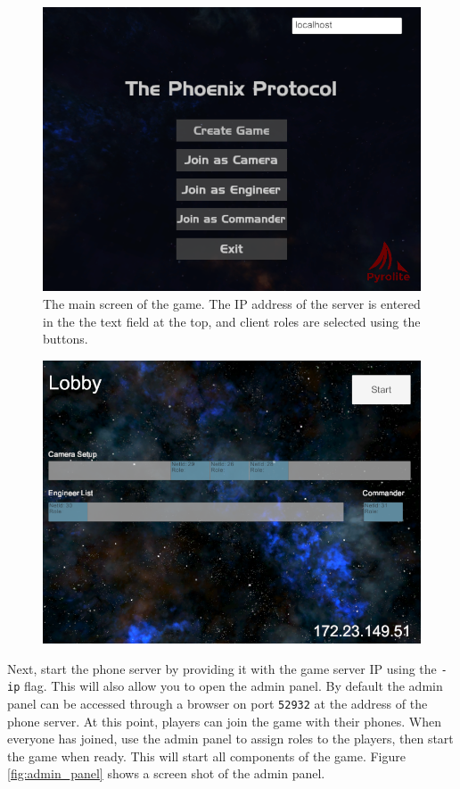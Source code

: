\documentclass[a4paper,11pt]{article}
\begin{document}
\begin{figure}[ht]
	\centering
    \includegraphics[width=.7\textwidth]{game_first_screen}
    \caption{The main screen of the game. The IP address of the server is entered in the the text field at the top, and client roles are selected using the buttons.}
    \label{fig:first_screen}
\end{figure}

\begin{figure}[ht]
  \centering
  \includegraphics[width=.7\textwidth]{game_lobby_screen}
  \label{fig:lobby_screen}
\end{figure}

Next, start the phone server by providing it with the game server IP using the \texttt{-ip} flag. This will also allow you to open the admin panel. By default the admin panel can be accessed through a browser on port \texttt{52932} at the address of the phone server. At this point, players can join the game with their phones. When everyone has joined, use the admin panel to assign roles to the players, then start the game when ready. This will start all components of the game. Figure \ref{fig:admin_panel} shows a screen shot of the admin panel.
\end{document}
